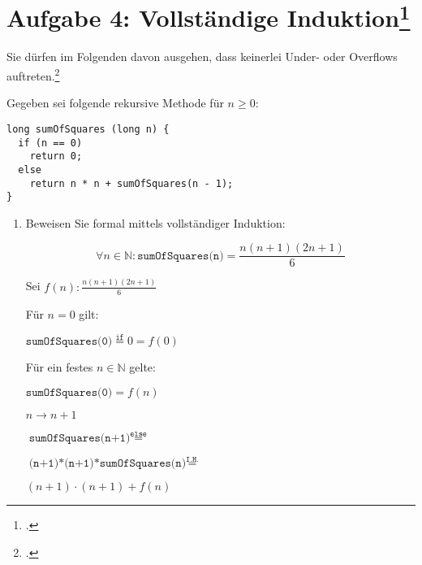 \documentclass{lehramt-informatik-minimal}
\begin{document}
\section{Aufgabe 4: Vollständige Induktion\footcite{sosy:ab:8}}

Sie dürfen im Folgenden davon ausgehen, dass keinerlei Under- oder
Overflows auftreten.\footcite[nach Frühjahr 2017 (66115) - Thema 1,
Aufgabe 4]{examen:66115:2017:03}

\noindent
Gegeben sei folgende rekursive Methode für $n \geq 0$:

\begin{verbatim}
long sumOfSquares (long n) {
  if (n == 0)
    return 0;
  else
    return n * n + sumOfSquares(n - 1);
}
\end{verbatim}

\begin{enumerate}


\item Beweisen Sie formal mittels vollständiger Induktion:

\begin{displaymath}
\forall n \in \mathbb{N} : \texttt{sumOfSquares(n)} =
\frac{n(n + 1)(2n + 1)}{6}
\end{displaymath}

\begin{antwort}
Sei $f(n): \frac{n(n + 1)(2n + 1)}{6}$

%


Für $n = 0$ gilt:

$\texttt{sumOfSquares(0)} \overset{\texttt{if}}{=} 0 = f(0)$

%


Für ein festes $n \in \mathbb{N}$ gelte:

$\texttt{sumOfSquares(0)} = f(n)$

%



$n \rightarrow n + 1$

$\texttt{sumOfSquares(n+1)} \overset{\texttt{else}}{=}$

$\texttt{(n+1)*(n+1)*sumOfSquares(n)} \overset{\texttt{I.H.}}{=}$

$(n + 1) \cdot (n + 1) + f(n)$


\end{antwort}
\end{enumerate}
\end{document}
